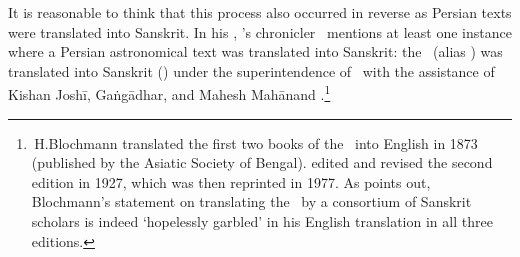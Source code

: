 It is reasonable to think that this process also occurred in reverse as Persian texts were translated into Sanskrit. In his \AiniAkbari, \Akbar's chronicler \AbulFadlAllami\ mentions at least one instance where a Persian astronomical text was translated into Sanskrit: the \ZijMirzai\ (alias \ZijUlughBeg) was translated into Sanskrit (\JicaUlugbegi) under the superintendence of \AmirFathullahofShiraz\ with the assistance of Kishan Joshī, Gaṅgādhar, and Mahesh Mahānand %
\parencite[110]{BlochmannAiniAkbari}.\footnote{\,H.\thinspace Blochmann translated the first two books of the \AiniAkbari\ into English in 1873 (published by the Asiatic Society of Bengal). \citeauthor{BlochmannAiniAkbari} edited and revised the second edition in 1927, which was then reprinted in 1977. As \textcite[footnote~20 on p.]{Sarmajyotisaraja} points out, Blochmann's statement on translating the \ZijUlughBeg\ by a consortium of Sanskrit scholars is indeed `hopelessly garbled' in his English translation in all three editions.} %

